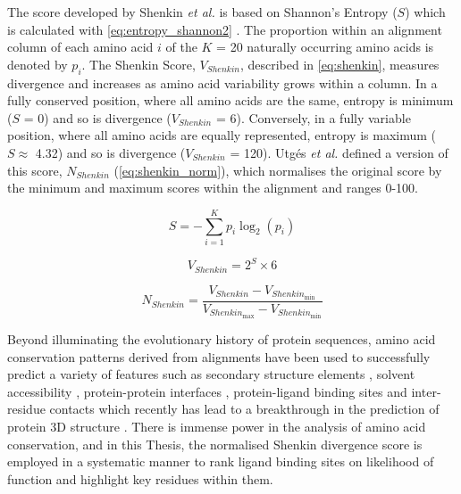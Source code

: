 The score developed by Shenkin \textit{et al.} \cite{SHENKIN_1991_SCORE} is based on Shannon's Entropy ($S$) which is calculated with \autoref{eq:entropy_shannon2} \cite{SHANNON_1948_ENTROPY}. The proportion within an alignment column of each amino acid $i$ of the $K$ = 20 naturally occurring amino acids is denoted by $p_i$. The Shenkin Score, $V_{Shenkin}$, described in \autoref{eq:shenkin}, measures divergence and increases as amino acid variability grows within a column. In a fully conserved position, where all amino acids are the same, entropy is minimum ($S$ = 0) and so is divergence ($V_{Shenkin}$ = 6). Conversely, in a fully variable position, where all amino acids are equally represented, entropy is maximum ($S \approx$ 4.32) and so is divergence ($V_{Shenkin}$ = 120). Utgés \textit{et al.} \cite{UTGES_2021_ANKS} defined a version of this score, $N_{Shenkin}$ (\autoref{eq:shenkin_norm}), which normalises the original score by the minimum and maximum scores within the alignment and ranges 0-100.

\begin{equation}
S = - \sum_{i=1}^{K} p_i \log_2(p_i)
\label{eq:entropy_shannon2}
\end{equation}

\begin{equation}
V_{Shenkin} = 2^S \times 6
\label{eq:shenkin}
\end{equation}

\begin{equation}
N_{Shenkin} = \frac{V_{Shenkin} - V_{Shenkin_{\text{min}}}}{V_{Shenkin_{\text{max}}} - V_{Shenkin_{\text{min}}}}
\label{eq:shenkin_norm}
\end{equation}

Beyond illuminating the evolutionary history of protein sequences, amino acid conservation patterns derived from alignments have been used to successfully predict a variety of features such as secondary structure elements \cite{ROST_1993_SSPRED}, solvent accessibility \cite{ROST_1994_RSAPRED}, protein-protein interfaces \cite{LICHTARGE_1996_PPIs}, protein-ligand binding sites \cite{GLASER_2006_PREDICTION} and inter-residue contacts \cite{MARKS_2011_CONS} which recently has lead to a breakthrough in the prediction of protein 3D structure \cite{JUMPER_2021_ALPHAFOLD}. There is immense power in the analysis of amino acid conservation, and in this Thesis, the normalised Shenkin divergence score is employed in a systematic manner to rank ligand binding sites on likelihood of function and highlight key residues within them. 

